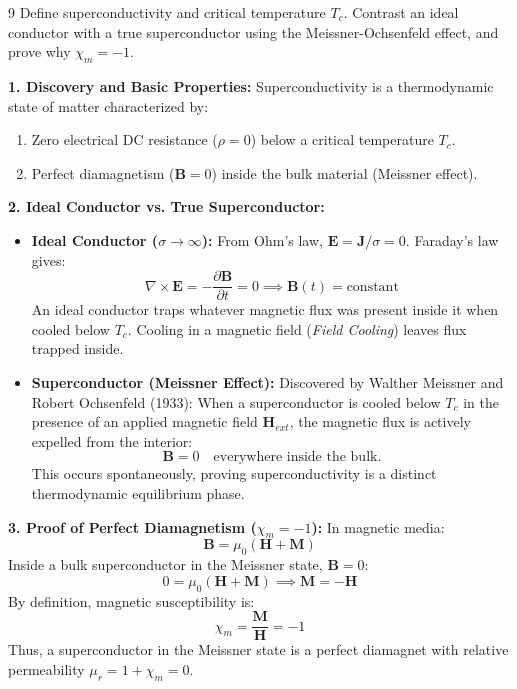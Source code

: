 \begin{theoryq}{9}
Define superconductivity and critical temperature $T_c$. Contrast an ideal conductor with a true superconductor using the Meissner-Ochsenfeld effect, and prove why $\chi_m = -1$.
\end{theoryq}
\begin{theorysol}
\textbf{1. Discovery and Basic Properties:}
Superconductivity is a thermodynamic state of matter characterized by:
\begin{enumerate}
\item Zero electrical DC resistance ($\rho = 0$) below a critical temperature $T_c$.
\item Perfect diamagnetism ($\mathbf{B} = 0$) inside the bulk material (Meissner effect).
\end{enumerate}

\textbf{2. Ideal Conductor vs. True Superconductor:}
\begin{itemize}
\item \textbf{Ideal Conductor ($\sigma \to \infty$):}
From Ohm's law, $\mathbf{E} = \mathbf{J}/\sigma = 0$. Faraday's law gives:
\begin{equation}
\nabla \times \mathbf{E} = -\frac{\partial \mathbf{B}}{\partial t} = 0 \implies \mathbf{B}(t) = \text{constant}
\end{equation}
An ideal conductor traps whatever magnetic flux was present inside it when cooled below $T_c$. Cooling in a magnetic field (\textit{Field Cooling}) leaves flux trapped inside.
\item \textbf{Superconductor (Meissner Effect):}
Discovered by Walther Meissner and Robert Ochsenfeld (1933): When a superconductor is cooled below $T_c$ in the presence of an applied magnetic field $\mathbf{H}_{ext}$, the magnetic flux is actively expelled from the interior:
\begin{equation}
\mathbf{B} = 0\quad \text{everywhere inside the bulk.}
\end{equation}
This occurs spontaneously, proving superconductivity is a distinct thermodynamic equilibrium phase.
\end{itemize}

\textbf{3. Proof of Perfect Diamagnetism ($\chi_m = -1$):}
In magnetic media:
\begin{equation}
\mathbf{B} = \mu_0(\mathbf{H} + \mathbf{M})
\end{equation}
Inside a bulk superconductor in the Meissner state, $\mathbf{B} = 0$:
\begin{equation}
0 = \mu_0(\mathbf{H} + \mathbf{M}) \implies \mathbf{M} = -\mathbf{H}
\end{equation}
By definition, magnetic susceptibility is:
\begin{equation}
\chi_m = \frac{\mathbf{M}}{\mathbf{H}} = -1
\end{equation}
Thus, a superconductor in the Meissner state is a perfect diamagnet with relative permeability $\mu_r = 1 + \chi_m = 0$.
\end{theorysol}
\vspace{4mm}

